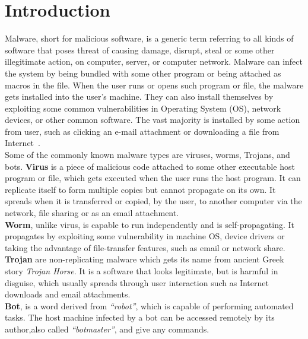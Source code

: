 \chapter{Introduction}\label{chapter:introduction}
Malware, short for malicious software, is a generic term referring to all kinds of software that poses threat of causing damage, disrupt, steal or some other illegitimate action, on computer, server, or computer network.
Malware can infect the system by being bundled with some other program or being attached as macros in the file.
When the user runs or opens such program or file, the malware gets installed into the user's machine.
They can also install themselves by exploiting some common vulnerabilities in Operating System (OS), network devices, or other common software.
The vast majority is installed by some action from user, such as clicking an e-mail attachment or downloading a file from Internet~\cite[]{ciscodif}.\\
Some of the commonly known malware types are viruses, worms, Trojans, and bots.
\textbf{Virus} is a piece of malicious code attached to some other executable host program or file, which gets executed when the user runs the host program.
It can replicate itself to form multiple copies but cannot propagate on its own.
It spreads when it is transferred or copied, by the user, to another computer via the network, file sharing or as an email attachment.\\
\textbf{Worm}, unlike virus, is capable to run independently and is self-propagating.
It propagates by exploiting some vulnerability in machine OS, device drivers or taking the advantage of file-transfer features, such as email or network share.\\
\textbf{Trojan} are non-replicating malware which gets its name from ancient Greek story \textit{Trojan Horse}.
It is a software that looks legitimate, but is harmful in disguise, which usually spreads through user interaction such as Internet downloads and email attachments.\\
\textbf{Bot}, is a word derived from \emph{``robot''}, which is capable of performing automated tasks.
The host machine infected by a bot can be accessed remotely by its author,also called \emph{``botmaster''}, and give any commands.
